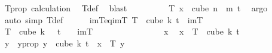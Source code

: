 \begin{isabellebody}
\ T{\isacharprime}{\kern0pt}{\isacharunderscore}{\kern0pt}prop\ calculation\ \isamarkupfalse%
\ T{\isacharprime}{\kern0pt}{\isacharunderscore}{\kern0pt}def\ \isamarkupfalse%
\ blast\isanewline
\ \ \ \ \ \ \isamarkupfalse%
\ \isamarkupfalse%
\ {\isachardoublequoteopen}T\ x\ {\isasymin}\ cube\ {\isacharparenleft}{\kern0pt}n\ {\isacharplus}{\kern0pt}\ m{\isacharparenright}{\kern0pt}\ {\isacharparenleft}{\kern0pt}t{\isacharplus}{\kern0pt}{}{\isacharparenright}{\kern0pt}{\isachardoublequoteclose}\ \isamarkupfalse%
\ argo\isanewline
\ \ \ \ \isamarkupfalse%
\ {\isacharparenleft}{\kern0pt}auto\ simp{\isacharcolon}{\kern0pt}\ T{\isacharunderscore}{\kern0pt}def{\isacharparenright}{\kern0pt}\isanewline
\isanewline
\ \ \ \ \isamarkupfalse%
\ im{\isacharunderscore}{\kern0pt}T{\isacharunderscore}{\kern0pt}eq{\isacharunderscore}{\kern0pt}imT{\isacharcolon}{\kern0pt}\ {\isachardoublequoteopen}T\ {\isacharbackquote}{\kern0pt}\ cube\ {\isacharparenleft}{\kern0pt}k{\isacharplus}{\kern0pt}{}{\isacharparenright}{\kern0pt}\ {\isacharparenleft}{\kern0pt}t{\isacharplus}{\kern0pt}{}{\isacharparenright}{\kern0pt}\ {\isacharequal}{\kern0pt}\ imT{\isachardoublequoteclose}\isanewline
\ \ \ \ \isamarkupfalse%
\isanewline
\ \ \ \ \ \ \isamarkupfalse%
\ {\isachardoublequoteopen}T\ {\isacharbackquote}{\kern0pt}\ cube\ {\isacharparenleft}{\kern0pt}k\ {\isacharplus}{\kern0pt}\ {}{\isacharparenright}{\kern0pt}\ {\isacharparenleft}{\kern0pt}t\ {\isacharplus}{\kern0pt}\ {}{\isacharparenright}{\kern0pt}\ {\isasymsubseteq}\ imT{\isachardoublequoteclose}\isanewline
\ \ \ \ \ \ \isamarkupfalse%
\isanewline
\ \ \ \ \ \ \ \ \isamarkupfalse%
\ x\ \isamarkupfalse%
\ {\isachardoublequoteopen}x\ {\isasymin}\ T\ {\isacharbackquote}{\kern0pt}\ cube\ {\isacharparenleft}{\kern0pt}k{\isacharplus}{\kern0pt}{}{\isacharparenright}{\kern0pt}\ {\isacharparenleft}{\kern0pt}t{\isacharplus}{\kern0pt}{}{\isacharparenright}{\kern0pt}{\isachardoublequoteclose}\isanewline
\ \ \ \ \ \ \ \ \isamarkupfalse%
\ \isamarkupfalse%
\ y\ \ y{\isacharunderscore}{\kern0pt}prop{\isacharcolon}{\kern0pt}\ {\isachardoublequoteopen}y\ {\isasymin}\ cube\ {\isacharparenleft}{\kern0pt}k{\isacharplus}{\kern0pt}{}{\isacharparenright}{\kern0pt}\ {\isacharparenleft}{\kern0pt}t{\isacharplus}{\kern0pt}{}{\isacharparenright}{\kern0pt}\ {\isasymand}\ x\ {\isacharequal}{\kern0pt}\ T\ y{\isachardoublequoteclose}\ \isamarkupfalse%

\end{isabellebody}
